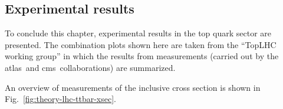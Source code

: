 \subsection{Experimental results}
\label{sec:theory-exp-results}

To conclude this chapter, experimental results in the top quark sector are presented. The combination plots shown here are taken from the ``TopLHC working group'' in which the results from measurements (carried out by the \gls{atlas}~and \gls{cms}~collaborations) are summarized.

An overview of measurements of the inclusive \ttbar cross section is shown in Fig.~\ref{fig:theory-lhc-ttbar-xsec}.



